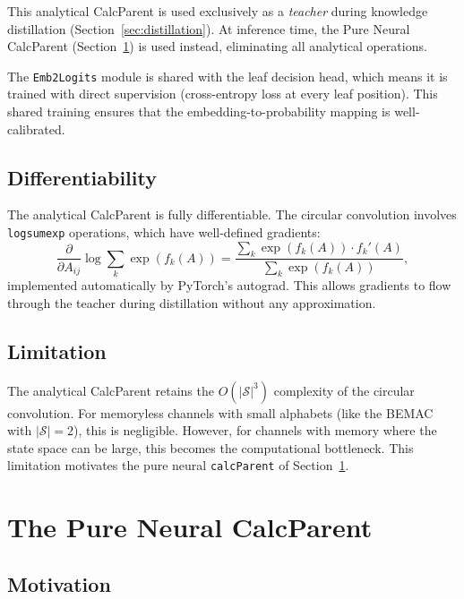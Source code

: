 \documentclass[11pt,a4paper]{article}
\begin{document}
This analytical CalcParent is used exclusively as a \emph{teacher} during knowledge distillation (Section~\ref{sec:distillation}). At inference time, the Pure Neural CalcParent (Section~\ref{sec:pure_neural}) is used instead, eliminating all analytical operations.

The \texttt{Emb2Logits} module is shared with the leaf decision head, which means it is trained with direct supervision (cross-entropy loss at every leaf position). This shared training ensures that the embedding-to-probability mapping is well-calibrated.

\subsection{Differentiability}

The analytical CalcParent is fully differentiable. The circular convolution involves \texttt{logsumexp} operations, which have well-defined gradients:
\begin{equation}
    \frac{\partial}{\partial A_{ij}} \log \sum_k \exp(f_k(A)) = \frac{\sum_k \exp(f_k(A)) \cdot f_k'(A)}{\sum_k \exp(f_k(A))},
\end{equation}
implemented automatically by PyTorch's autograd. This allows gradients to flow through the teacher during distillation without any approximation.

\subsection{Limitation}

The analytical CalcParent retains the $O(|\mathcal{S}|^3)$ complexity of the circular convolution. For memoryless channels with small alphabets (like the BEMAC with $|\mathcal{S}| = 2$), this is negligible. However, for channels with memory where the state space can be large, this becomes the computational bottleneck. This limitation motivates the pure neural \texttt{calcParent} of Section~\ref{sec:pure_neural}.

\section{The Pure Neural CalcParent}
\label{sec:pure_neural}

\subsection{Motivation}
\end{document}
